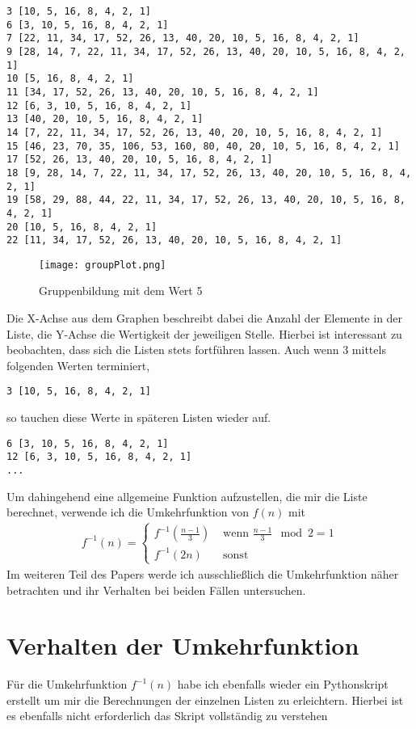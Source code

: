 \documentclass{article}
\begin{document}
\begin{verbatim}
3 [10, 5, 16, 8, 4, 2, 1]
6 [3, 10, 5, 16, 8, 4, 2, 1]
7 [22, 11, 34, 17, 52, 26, 13, 40, 20, 10, 5, 16, 8, 4, 2, 1]
9 [28, 14, 7, 22, 11, 34, 17, 52, 26, 13, 40, 20, 10, 5, 16, 8, 4, 2, 1]
10 [5, 16, 8, 4, 2, 1]
11 [34, 17, 52, 26, 13, 40, 20, 10, 5, 16, 8, 4, 2, 1]
12 [6, 3, 10, 5, 16, 8, 4, 2, 1]
13 [40, 20, 10, 5, 16, 8, 4, 2, 1]
14 [7, 22, 11, 34, 17, 52, 26, 13, 40, 20, 10, 5, 16, 8, 4, 2, 1]
15 [46, 23, 70, 35, 106, 53, 160, 80, 40, 20, 10, 5, 16, 8, 4, 2, 1]
17 [52, 26, 13, 40, 20, 10, 5, 16, 8, 4, 2, 1]
18 [9, 28, 14, 7, 22, 11, 34, 17, 52, 26, 13, 40, 20, 10, 5, 16, 8, 4, 2, 1]
19 [58, 29, 88, 44, 22, 11, 34, 17, 52, 26, 13, 40, 20, 10, 5, 16, 8, 4, 2, 1]
20 [10, 5, 16, 8, 4, 2, 1]
22 [11, 34, 17, 52, 26, 13, 40, 20, 10, 5, 16, 8, 4, 2, 1]
\end{verbatim}
\begin{figure}[htp]
    \centering
    \texttt{[image: groupPlot.png]}
    \caption{Gruppenbildung mit dem Wert 5}
\end{figure}
\noindent  Die X-Achse aus dem Graphen beschreibt dabei die Anzahl der Elemente in der Liste, die Y-Achse die Wertigkeit der jeweiligen Stelle. Hierbei ist interessant zu beobachten, dass sich die Listen stets fortführen lassen. Auch wenn 3 mittels folgenden Werten terminiert,
\begin{verbatim}
3 [10, 5, 16, 8, 4, 2, 1]
\end{verbatim}
\noindent so tauchen diese Werte in späteren Listen wieder auf.
\begin{verbatim}
6 [3, 10, 5, 16, 8, 4, 2, 1]
12 [6, 3, 10, 5, 16, 8, 4, 2, 1]
...
\end{verbatim}
\noindent Um dahingehend eine allgemeine Funktion aufzustellen, die mir die Liste berechnet, verwende ich die Umkehrfunktion von $f(n)$ mit 
\begin{align*}
f^{-1}(n)=
\begin{cases}
f^{-1}(\frac{n-1}{3}) & \text{ wenn } \frac{n-1}{3} \mod 2 = 1 \\
f^{-1}(2n) & \text{ sonst }
\end{cases} 
\end{align*}
\noindent Im weiteren Teil des Papers werde ich ausschließlich die Umkehrfunktion näher betrachten und ihr Verhalten bei beiden Fällen untersuchen.
\newpage
\section{Verhalten der Umkehrfunktion}
Für die Umkehrfunktion $f^{-1}(n)$ habe ich ebenfalls wieder ein Pythonskript erstellt um mir die Berechnungen der einzelnen Listen zu erleichtern. Hierbei ist es ebenfalls nicht erforderlich das Skript vollständig zu verstehen
\end{document}
